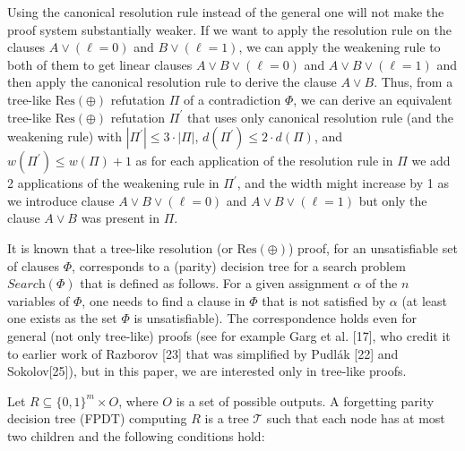 \documentclass[10pt,a4paper]{article}
\begin{document}
Using the canonical resolution rule instead of the general one will not make the proof system substantially weaker.
If we want to apply the resolution rule on the clauses $A\vee(\ell=0)$ and $B\vee(\ell=1)$, we can apply the weakening rule to both of them to get linear clauses $A\vee B\vee(\ell=0)$ and $A\vee B\vee(\ell=1)$ and then apply the canonical resolution rule to derive the clause $A\vee B$.
Thus, from a tree-like $\text{Res}(\oplus)$ refutation $\Pi$ of a contradiction $\Phi$, we can derive an equivalent tree-like $\text{Res}(\oplus)$ refutation $\Pi^{\prime}$ that uses only canonical resolution rule (and the weakening rule) with $|\Pi^{\prime}|\leq 3\cdot|\Pi|$, $d(\Pi^{\prime})\leq 2\cdot d(\Pi)$, and $w(\Pi^{\prime})\leq w(\Pi)+1$ as for each application of the resolution rule in $\Pi$ we add 2 applications of the weakening rule in $\Pi^{\prime}$, and the width might increase by 1 as we introduce clause $A\vee B\vee(\ell=0)$ and $A\vee B\vee(\ell=1)$ but only the clause $A\vee B$ was present in $\Pi$.\par




It is known that a tree-like resolution (or $\text{Res}(\oplus)$) proof, for an unsatisfiable set of clauses $\Phi$, corresponds to a (parity) decision tree for a search problem $\textit{Search}(\Phi)$
that is defined as follows.
For a given assignment $\alpha$ of the $n$ variables of $\Phi$, one needs to find a clause in $\Phi$ that is not satisfied by $\alpha$ (at least one exists as the set $\Phi$ is unsatisfiable).
The correspondence holds even for general (not only tree-like) proofs
(see for example Garg et al. [17], who credit it to earlier work of Razborov [23] that was simplified by Pudlák [22] and Sokolov[25]), but in this paper, we are interested only in tree-like proofs.\par




Let $R\subseteq\{0,1\}^{m}\times O$, where $O$ is a set of possible outputs.
A forgetting parity decision tree (FPDT) computing $R$ is a tree $\mathcal{T}$ such that each node has at most two children and the following conditions hold:\par
\end{document}
